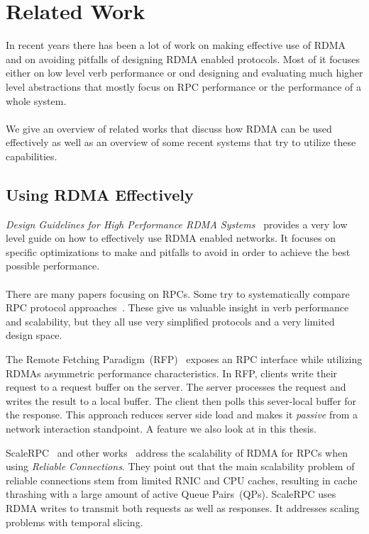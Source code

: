 \section{Related Work}

In recent years there has been a lot of work on making effective use of RDMA and on avoiding pitfalls of designing  
RDMA enabled protocols. Most of it focuses either on low level verb performance or ond designing and evaluating
much higher level abstractions that mostly focus on RPC performance or the performance of a whole system.

\paragraph{} We give an overview of related works that discuss how  RDMA can be used effectively as well as an overview of 
some recent systems that try to utilize these capabilities.

\subsection{Using RDMA Effectively}

\emph{Design Guidelines for High Performance RDMA Systems}~\cite{anuj-guide} provides a very low level guide on how to
effectively use RDMA enabled networks. It focuses on specific optimizations to make and pitfalls to avoid in order to 
achieve the best possible performance. 

\paragraph{} There are many papers focusing on RPCs. Some try to systematically compare RPC protocol
approaches~\cite{ziegler2020rdma,Huang2019AnEO}.  These give us valuable insight in verb performance and scalability, but 
they all use very simplified protocols and a very limited design space.

The Remote Fetching Paradigm~(RFP)~\cite{rfp} exposes an RPC interface while utilizing RDMAs asymmetric performance 
characteristics. In RFP, clients write their request to a request buffer on the server. The server processes the request
and writes the result to a local buffer. The client then polls this sever-local buffer for the response. This approach reduces 
server side load and makes it \emph{passive} from a network interaction standpoint. A feature we also look at in this thesis.

ScaleRPC~\cite{scal-rdma-rpc} and other works~\cite{fasst, rfp, herd} address the scalability of RDMA for RPCs when using 
\emph{Reliable Connections}. They point out that the main scalability problem of reliable connections stem from limited 
RNIC and CPU caches, resulting in cache thrashing with a large amount of active Queue Pairs~(QPs). ScaleRPC uses RDMA writes to 
transmit both requests as well as responses. It addresses scaling problems with temporal slicing.




